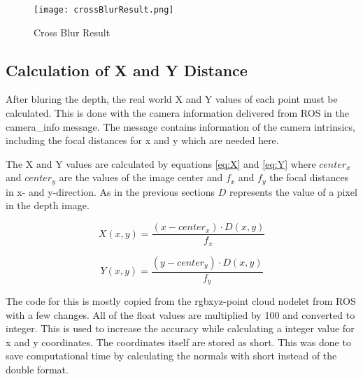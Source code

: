 \begin{figure}[H]
\begin{center}
  \texttt{[image: crossBlurResult.png]}
  \caption{Cross Blur Result}
  \label{figure:crossblurResult}
\end{center}
\end{figure} 


\subsection{Calculation of X and Y Distance}
After bluring the depth, the real world X and Y values of each point must be calculated. 
This is done with the camera information delivered from ROS in the camera\_info message.
The message contains information of the camera intrinsics, including the focal 
distances for x and y which are needed here.

The X and Y values are calculated by equations \vref{eq:X} and \vref{eq:Y} where $center_x$ and $center_y$ are
the values of the image center and $f_x$ and $f_y$ the focal distances in x- and y-direction. As in the
previous sections $D$ represents the value of a pixel in the depth image.

\begin{equation}
X(x,y)=\frac{(x-center_x) \cdot D(x,y)}{f_x}
\label{eq:X}
\end{equation}

\begin{equation}
Y(x,y)=\frac{(y-center_y) \cdot D(x,y)}{f_y}
\label{eq:Y}
\end{equation}




The code for this is mostly copied from the rgbxyz-point cloud nodelet from ROS with a few changes.
All of the float values are multiplied by 100 and converted to integer. This is used to increase the accuracy while
calculating a integer value for x and y coordinates. The coordinates itself are stored as short. This was done to save
computational time by calculating the normals with short instead of the double format.


